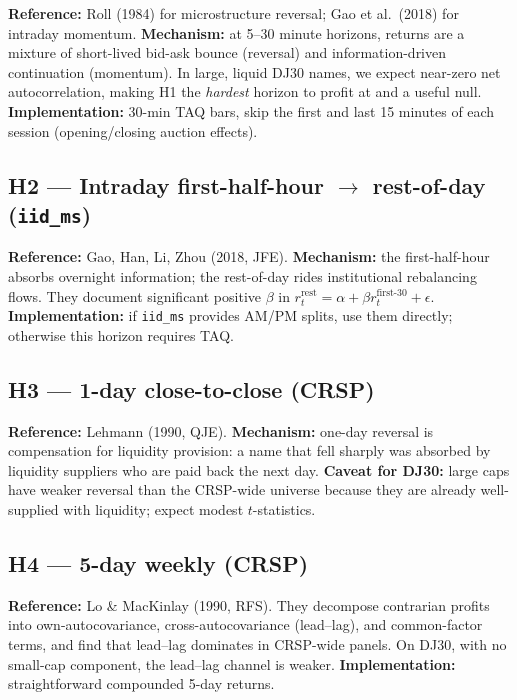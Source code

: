\documentclass[11pt,letterpaper]{article}
\begin{document}
\textbf{Reference:} Roll (1984) for microstructure reversal; Gao et al.\ (2018) for intraday momentum. \textbf{Mechanism:} at 5--30 minute horizons, returns are a mixture of short-lived bid-ask bounce (reversal) and information-driven continuation (momentum). In large, liquid DJ30 names, we expect near-zero net autocorrelation, making H1 the \emph{hardest} horizon to profit at and a useful null. \textbf{Implementation:} 30-min TAQ bars, skip the first and last 15 minutes of each session (opening/closing auction effects).

\subsection{H2 --- Intraday first-half-hour $\to$ rest-of-day (\texttt{iid\_ms})}

\textbf{Reference:} Gao, Han, Li, Zhou (2018, JFE). \textbf{Mechanism:} the first-half-hour absorbs overnight information; the rest-of-day rides institutional rebalancing flows. They document significant positive $\beta$ in $r^{\text{rest}}_t = \alpha + \beta r^{\text{first-30}}_t + \epsilon$. \textbf{Implementation:} if \texttt{iid\_ms} provides AM/PM splits, use them directly; otherwise this horizon requires TAQ.

\subsection{H3 --- 1-day close-to-close (CRSP)}

\textbf{Reference:} Lehmann (1990, QJE). \textbf{Mechanism:} one-day reversal is compensation for liquidity provision: a name that fell sharply was absorbed by liquidity suppliers who are paid back the next day. \textbf{Caveat for DJ30:} large caps have weaker reversal than the CRSP-wide universe because they are already well-supplied with liquidity; expect modest $t$-statistics.

\subsection{H4 --- 5-day weekly (CRSP)}

\textbf{Reference:} Lo \& MacKinlay (1990, RFS). They decompose contrarian profits into own-autocovariance, cross-autocovariance (lead--lag), and common-factor terms, and find that lead--lag dominates in CRSP-wide panels. On DJ30, with no small-cap component, the lead--lag channel is weaker. \textbf{Implementation:} straightforward compounded 5-day returns.
\end{document}
